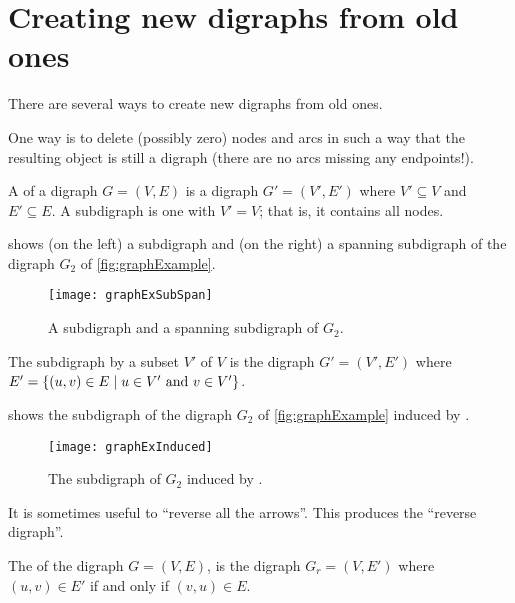 \section{Creating new digraphs from old ones}

There are several ways to create new digraphs from old ones.

One way is to delete (possibly zero) nodes and arcs in such a way that the 
resulting object is still a digraph (there are no arcs missing any
endpoints!).

\begin{Definition}
A  of a digraph $G = (V, E)$ is a digraph $G' = (V', E')$ 
where $V'\subseteq V$ and $E'\subseteq E$. 
A  subdigraph is one with $V' = V$; that is, it contains all nodes.
\end{Definition}

\begin{Example}
 shows (on the left) a subdigraph and (on the right) 
a spanning subdigraph of the digraph $G_2$ of \cref{fig:graphExample}.
\end{Example}

\begin{figure}[h]
\centering
\texttt{[image: graphExSubSpan]} 
\caption{A subdigraph and a spanning subdigraph of $G_2$.}
\label{fig:sub+span}
\end{figure}

\begin{Definition}
The subdigraph  by a subset $V'$ of $V$ is the digraph
$G' = (V', E')$ where $E' = \mbox{$\{(u, v) \in E \mid u \in V' \mbox{ and } v\in V'\}$}$.
\end{Definition}

\begin{Example}
 shows the subdigraph of the  digraph $G_2$ of \cref{fig:graphExample} induced by 
.
\end{Example}

\begin{figure}[h]
\centering
\texttt{[image: graphExInduced]}
\caption{The subdigraph of $G_2$ induced by .}
\label{fig:induced}
\end{figure}

It is sometimes useful to ``reverse all the arrows''. This produces the ``reverse digraph''.

\begin{Definition}
The  of the digraph $G = (V, E)$, is the digraph $G_r = (V, E')$ where $(u, v)\in E'$ if and only if $(v, u)\in E$.
\end{Definition}

